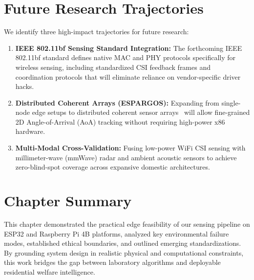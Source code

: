 \section{Future Research Trajectories}
We identify three high-impact trajectories for future research:
\begin{enumerate}
    \item \textbf{IEEE 802.11bf Sensing Standard Integration:} The forthcoming IEEE 802.11bf standard defines native MAC and PHY protocols specifically for wireless sensing, including standardized CSI feedback frames and coordination protocols that will eliminate reliance on vendor-specific driver hacks.
    \item \textbf{Distributed Coherent Arrays (ESPARGOS):} Expanding from single-node edge setups to distributed coherent sensor arrays~\cite{espargos2024espargos} will allow fine-grained 2D Angle-of-Arrival (AoA) tracking without requiring high-power x86 hardware.
    \item \textbf{Multi-Modal Cross-Validation:} Fusing low-power WiFi CSI sensing with millimeter-wave (mmWave) radar and ambient acoustic sensors to achieve zero-blind-spot coverage across expansive domestic architectures.
\end{enumerate}

\section{Chapter Summary}
This chapter demonstrated the practical edge feasibility of our sensing pipeline on ESP32 and Raspberry Pi 4B platforms, analyzed key environmental failure modes, established ethical boundaries, and outlined emerging standardizations. By grounding system design in realistic physical and computational constraints, this work bridges the gap between laboratory algorithms and deployable residential welfare intelligence.
